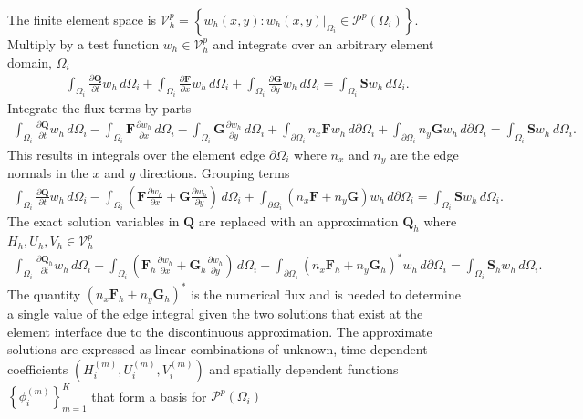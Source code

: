 \documentclass[11pt]{article}
\begin{document}
The finite element space is $\mathcal{V}_h^p = \left\{w_h(x,y): w_h(x,y)\big|_{\Omega_i} \in \mathcal{P}^p(\Omega_i) \right\}$.  Multiply by a test function $w_h \in \mathcal{V}_h^p$ and integrate over an arbitrary element domain, $\Omega_i$
\begin{align}
\int_{\Omega_i}\!\frac{\partial \mathbf{Q}}{\partial t}w_h \,d\Omega_i + \int_{\Omega_i}\!\frac{\partial \mathbf{F}}{\partial x}w_h\, d\Omega_i + \int_{\Omega_i}\!\frac{\partial \mathbf{G}}{\partial y}w_h \,d\Omega_i = \int_{\Omega_i}\!\mathbf{S}w_h \,d\Omega_i.
\end{align}
Integrate the flux terms by parts
\begin{align}
\int_{\Omega_i}\!\frac{\partial \mathbf{Q}}{\partial t}w_h\, d\Omega_i - \int_{\Omega_i}\!\mathbf{F}\frac{\partial w_h}{\partial x}\, d\Omega_i - \int_{\Omega_i}\!\mathbf{G}\frac{\partial w_h}{\partial y}\, d\Omega_i + \int_{\partial \Omega_i}\! n_x\mathbf{F}w_h \,d\partial \Omega_i + \int_{\partial \Omega_i} \! n_y\mathbf{G}w_h\, d\partial \Omega_i= \int_{\Omega_i}\!\mathbf{S}w_h \,d\Omega_i.
\end{align}
This results in integrals over the element edge $\partial \Omega_i$ where $n_x$ and $n_y$ are the edge normals in the $x$ and $y$ directions.  Grouping terms
\begin{align}
\int_{\Omega_i}\!\frac{\partial \mathbf{Q}}{\partial t}w_h\, d\Omega_i - \int_{\Omega_i}\! \left(\mathbf{F}\frac{\partial w_h}{\partial x} + \mathbf{G}\frac{\partial w_h}{\partial y} \right)\,d\Omega_i + \int_{\partial \Omega_i}\! \left(n_x\mathbf{F} + n_y\mathbf{G}\right)w_h \,d\partial \Omega_i= \int_{\Omega_i}\!\mathbf{S}w_h\, d\Omega_i.
\end{align}
The exact solution variables in $\mathbf{Q}$ are replaced with an approximation $\mathbf{Q}_h$ where $H_h,U_h,V_h \in \mathcal{V}_h^p$
\begin{align}
\int_{\Omega_i}\!\frac{\partial \mathbf{Q}_h}{\partial t}w_h \, d\Omega_i - \int_{\Omega_i}\! \left(\mathbf{F}_h\frac{\partial w_h}{\partial x} + \mathbf{G}_h\frac{\partial w_h}{\partial y} \right) \, d\Omega_i + \int_{\partial \Omega_i}\! \left(n_x\mathbf{F}_h + n_y\mathbf{G}_h\right)^*w_h \,d\partial \Omega_i= \int_{\Omega_i}\! \mathbf{S}_hw_h \, d\Omega_i.
\end{align}
The quantity $\left(n_x\mathbf{F}_h + n_y\mathbf{G}_h\right)^* $ is the numerical flux and is needed to determine a single value of the edge integral given the two solutions that exist at the element interface due to the discontinuous approximation. The approximate solutions are expressed as linear combinations of unknown, time-dependent coefficients $\left(H_i^{(m)}, U_i^{(m)}, V_i^{(m)}\right)$ and spatially dependent functions $\left\{\phi_i^{(m)}\right\}_{m=1}^K$ that form a basis for $\mathcal{P}^p(\Omega_i)$
\end{document}
